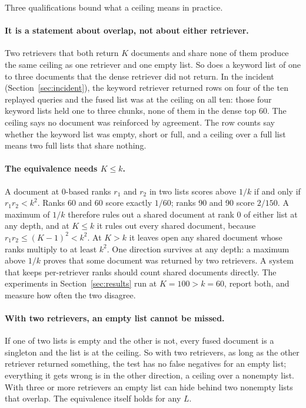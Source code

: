 \documentclass[11pt]{article}
\begin{document}
Three qualifications bound what a ceiling means in practice.

\paragraph{It is a statement about overlap, not about either retriever.} Two retrievers that both return $K$ documents and share none of them produce the same ceiling as one retriever and one empty list. So does a keyword list of one to three documents that the dense retriever did not return. In the incident (Section~\ref{sec:incident}), the keyword retriever returned rows on four of the ten replayed queries and the fused list was at the ceiling on all ten: those four keyword lists held one to three chunks, none of them in the dense top 60. The ceiling says no document was reinforced by agreement. The row counts say whether the keyword list was empty, short or full, and a ceiling over a full list means two full lists that share nothing.

\paragraph{The equivalence needs $K \le k$.} A document at 0-based ranks $r_1$ and $r_2$ in two lists scores above $1/k$ if and only if $r_1 r_2 < k^2$. Ranks 60 and 60 score exactly $1/60$; ranks 90 and 90 score $2/150$. A maximum of $1/k$ therefore rules out a shared document at rank 0 of either list at any depth, and at $K \le k$ it rules out every shared document, because $r_1 r_2 \le (K-1)^2 < k^2$. At $K > k$ it leaves open any shared document whose ranks multiply to at least $k^2$. One direction survives at any depth: a maximum above $1/k$ proves that some document was returned by two retrievers. A system that keeps per-retriever ranks should count shared documents directly. The experiments in Section~\ref{sec:results} run at $K = 100 > k = 60$, report both, and measure how often the two disagree.

\paragraph{With two retrievers, an empty list cannot be missed.} If one of two lists is empty and the other is not, every fused document is a singleton and the list is at the ceiling. So with two retrievers, as long as the other retriever returned something, the test has no false negatives for an empty list; everything it gets wrong is in the other direction, a ceiling over a nonempty list. With three or more retrievers an empty list can hide behind two nonempty lists that overlap. The equivalence itself holds for any $L$.
\end{document}
